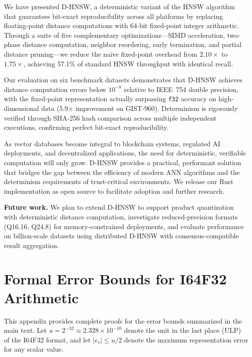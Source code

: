 \documentclass[10pt,journal,compsoc]{IEEEtran}
\newcommand{\dhnsw}{\textsc{D-HNSW}}
\newcommand{\hnsw}{\textsc{HNSW}}
\begin{document}
We have presented \dhnsw{}, a deterministic variant of the \hnsw{} algorithm that guarantees bit-exact reproducibility across all platforms by replacing floating-point distance computations with 64-bit fixed-point integer arithmetic. Through a suite of five complementary optimizations---SIMD acceleration, two-phase distance computation, neighbor reordering, early termination, and partial distance pruning---we reduce the na\"ive fixed-point overhead from $2.10\times$ to $1.75\times$, achieving 57.1\% of standard \hnsw{} throughput with identical recall.

Our evaluation on six benchmark datasets demonstrates that \dhnsw{} achieves distance computation errors below $10^{-8}$ relative to IEEE~754 double precision, with the fixed-point representation actually surpassing \texttt{f32} accuracy on high-dimensional data (5.9$\times$ improvement on GIST-960). Determinism is rigorously verified through SHA-256 hash comparison across multiple independent executions, confirming perfect bit-exact reproducibility.

As vector databases become integral to blockchain systems, regulated AI deployments, and decentralized applications, the need for deterministic, verifiable computation will only grow. \dhnsw{} provides a practical, performant solution that bridges the gap between the efficiency of modern ANN algorithms and the determinism requirements of trust-critical environments. We release our Rust implementation as open source to facilitate adoption and further research.

\textbf{Future work.} We plan to extend \dhnsw{} to support product quantization with deterministic distance computation, investigate reduced-precision formats (Q16.16, Q24.8) for memory-constrained deployments, and evaluate performance on billion-scale datasets using distributed \dhnsw{} with consensus-compatible result aggregation.

\appendices
\section{Formal Error Bounds for I64F32 Arithmetic}
\label{sec:appendix_proofs}

This appendix provides complete proofs for the error bounds summarized in the main text. Let $u = 2^{-32} \approx 2.328 \times 10^{-10}$ denote the unit in the last place (ULP) of the I64F32 format, and let $|\epsilon_v| \leq u/2$ denote the maximum representation error for any scalar value.
\end{document}
